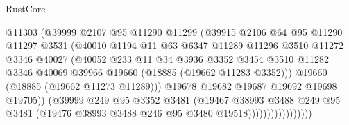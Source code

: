 \begin{lexlean}{RustCore}
\begin{coremodule}
                                @11303
                                (@39999
                                  @2107
                                  @95
                                  @11290
                                  @11299
                                  (@39915
                                    @2106
                                    @64
                                    @95
                                    @11290
                                    @11297
                                    @3531
                                    (@40010
                                      @1194
                                      @11
                                      @63
                                      @6347
                                      @11289
                                      @11296
                                      @3510
                                      @11272
                                      @3346
                                      @40027
                                      (@40052
                                        @233
                                        @11
                                        @34
                                        @3936
                                        @3352
                                        @3454
                                        @3510
                                        @11282
                                        @3346
                                        @40069
                                        @39966
                                        @19660
                                        (@18885 (@19662 @11283 @3352)))
                                      @19660
                                      (@18885 (@19662 @11273 @11289)))
                                    @19678
                                    @19682
                                    @19687
                                    @19692
                                    @19698
                                    @19705))
                                (@39999
                                  @249
                                  @95
                                  @3352
                                  @3481
                                  (@19467
                                    @38993
                                    @3488
                                    @249
                                    @95
                                    @3481
                                    (@19476 @38993 @3488 @246 @95 @3480 @19518)))))))))))))))))

\end{coremodule}
\end{lexlean}
